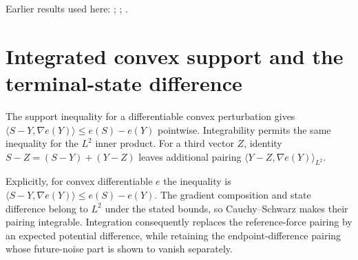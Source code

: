 \documentclass[11pt,a4paper]{article}
\begin{document}
Earlier results used here: \cite[Section~3.13.2]{LangevinLean2026ULASC}; \cite[Section~3.13.3]{LangevinLean2026ULASC}; \cite[Section~3.11.1]{LangevinLean2026IPLA}.

\section{\texorpdfstring{Integrated convex support and the terminal-state difference}{Integrated convex support and the terminal-state difference}}


The support inequality for a differentiable convex perturbation gives \(\langle S-Y,\nabla e(Y)\rangle\le e(S)-e(Y)\) pointwise. Integrability permits the same inequality for the \(L^2\) inner product. For a third vector \(Z\), identity \(S-Z=(S-Y)+(Y-Z)\) leaves additional pairing \(\langle Y-Z,\nabla e(Y)\rangle_{L^2}\).



Explicitly, for convex differentiable \(e\) the inequality is \(\langle S-Y,\nabla e(Y)\rangle\le e(S)-e(Y)\). The gradient composition and state difference belong to \(L^2\) under the stated bounds, so Cauchy–Schwarz makes their pairing integrable. Integration consequently replaces the reference-force pairing by an expected potential difference, while retaining the endpoint-difference pairing whose future-noise part is shown to vanish separately.
\end{document}

